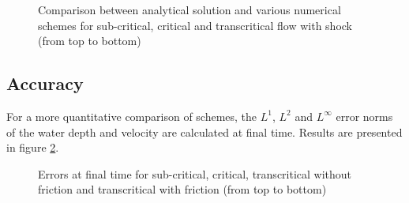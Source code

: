 \begin{figure}[H]
\begin{minipage}[t]{0.5\textwidth}
 \centering
\end{minipage}%
\begin{minipage}[t]{0.5\textwidth}
 \centering
\end{minipage}
\begin{minipage}[t]{0.5\textwidth}
 \centering
\end{minipage}%
\begin{minipage}[t]{0.5\textwidth}
 \centering
\end{minipage}
\begin{minipage}[t]{0.5\textwidth}
 \centering
\end{minipage}%
\begin{minipage}[t]{0.5\textwidth}
 \centering
\end{minipage}
 \caption{Comparison between analytical solution and various  numerical schemes
 for sub-critical, critical and transcritical flow with shock (from top to bottom)}\label{fig:bumpsub:fig:comp}
\end{figure}

\subsection{Accuracy}

For a more quantitative comparison of schemes, the $L^1$, $L^2$ and $L^\infty$ error norms
of the water depth and velocity are calculated at final time.
Results are presented in figure \ref{fig:bump:errors}.

\begin{figure}[H]
  \centering
  \caption{Errors at final time for sub-critical, critical, transcritical without friction and transcritical with friction (from top to bottom)}\label{fig:bump:errors}
\end{figure}

